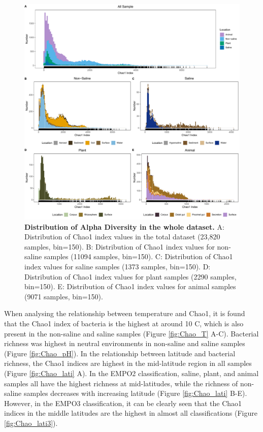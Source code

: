 \documentclass[11pt, a4paper]{article}
\begin{document}
\begin{spacing}{1.5}
\begin{figure}
    \centering
    \includegraphics[scale=0.33]{./Figures/Chao_hist_empo2}
    \caption{\textbf{Distribution of Alpha Diversity in the whole dataset.} A: Distribution of Chao1 index values in the total dataset (23,820 samples, bin=150). B: Distribution of Chao1 index values for non-saline samples (11094 samples, bin=150). C: Distribution of Chao1 index values for saline samples (1373 samples, bin=150). D: Distribution of Chao1 index values for plant samples (2290 samples, bin=150). E: Distribution of Chao1 index values for animal samples (9071 samples, bin=150).}
    \label{fig:Chao_hist}
\end{figure}

When analysing the relationship between temperature and Chao1, it is found that the Chao1 index of bacteria is the highest at around 10 \textdegree C, which is also present in the non-saline and saline samples (Figure \ref{fig:Chao_T} A-C). Bacterial richness was highest in neutral environments in non-saline and saline samples (Figure \ref{fig:Chao_pH}). In the relationship between latitude and bacterial richness, the Chao1 indices are highest in the mid-latitude region in all samples (Figure \ref{fig:Chao_lati} A). In the EMPO2 classification, saline, plant, and animal samples all have the highest richness at mid-latitudes, while the richness of non-saline samples decreases with increasing latitude (Figure \ref{fig:Chao_lati} B-E). However, in the EMPO3 classification, it can be clearly seen that the Chao1 indices in the middle latitudes are the highest in almost all classifications (Figure  \ref{fig:Chao_lati3}).


\end{spacing}
\end{document}
